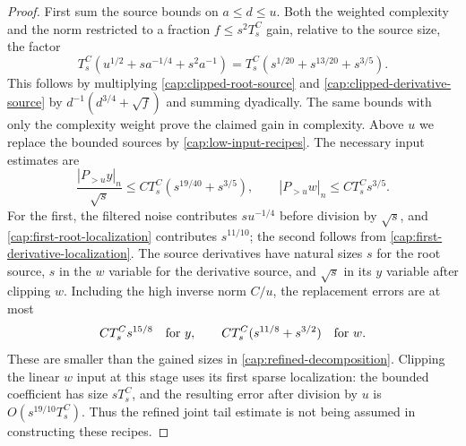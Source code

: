\begin{proof}
First sum the source bounds on $a\le d\le u$.  Both the weighted
complexity and the norm restricted to a fraction
$f\le s^2T_s^C$ gain, relative to the source size, the factor
\begin{equation}\label{cap:middle-band-gain}
 T_s^C(u^{1/2}+sa^{-1/4}+s^2a^{-1})
       =T_s^C(s^{1/20}+s^{13/20}+s^{3/5}).
\end{equation}
This follows by multiplying \eqref{cap:clipped-root-source} and
\eqref{cap:clipped-derivative-source} by $d^{-1}(d^{3/4}+\sqrt f)$ and summing
dyadically. The same bounds with only the complexity weight prove the claimed
gain in complexity. Above $u$ we replace the bounded sources by
\eqref{cap:low-input-recipes}. The necessary input estimates are
\begin{equation}\label{cap:high-input-bounds}
 \frac{|P_{>u}y|_n}{\sqrt s}
      \le CT_s^C(s^{19/40}+s^{3/5}),
 \qquad |P_{>u}w|_n\le CT_s^Cs^{3/5}.
\end{equation}
For the first, the filtered noise contributes $s u^{-1/4}$ before division by
$\sqrt s$, and \eqref{cap:first-root-localization} contributes $s^{11/10}$;
the second follows from \eqref{cap:first-derivative-localization}. The source
derivatives have natural sizes $s$ for the root source, $s$ in the $w$
variable for the derivative source, and $\sqrt s$ in its $y$ variable after
clipping $w$. Including the high inverse norm $C/u$, the replacement errors
are at most
\[
 CT_s^Cs^{15/8}\quad\hbox{for }y,\qquad
 CT_s^C(s^{11/8}+s^{3/2})\quad\hbox{for }w.
\]
These are smaller than the gained sizes in \eqref{cap:refined-decomposition}.
Clipping the linear $w$ input at this stage uses its first sparse
localization: the bounded coefficient has size $sT_s^C$, and the resulting
error after division by $u$ is $O(s^{19/10}T_s^C)$. Thus the refined joint
tail estimate is not being assumed in constructing these recipes.


\end{proof}
